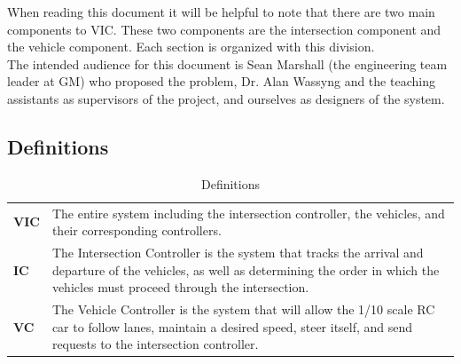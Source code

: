 \documentclass [10pt]{article}
\begin{document}
When reading this document it will be helpful to note that there are two main components to VIC. These two components are the intersection component and the vehicle component.  Each section is organized with this division.   \\

The intended audience for this document is Sean Marshall (the engineering team leader at GM) who proposed the problem, Dr. Alan Wassyng and the teaching assistants as supervisors of the project, and ourselves as designers of the system.

\subsection{Definitions}

\begin{longtable}{ |p{ } p{ }|} \caption{Definitions} \\ \hline


\textbf{VIC} & The entire system including the intersection controller, the vehicles, and their corresponding controllers. \\ 

\rowcolor{tableCell}\textbf{IC}  & The Intersection Controller is the system that tracks the arrival and departure of the vehicles, as well as determining the order in which the vehicles must proceed through the intersection.\\

\textbf{VC} & The Vehicle Controller is the system that will allow the 1/10 scale RC car to follow lanes, maintain a desired speed, steer itself, and send requests to the intersection controller. \\\hline


\end{longtable}
\end{document}
